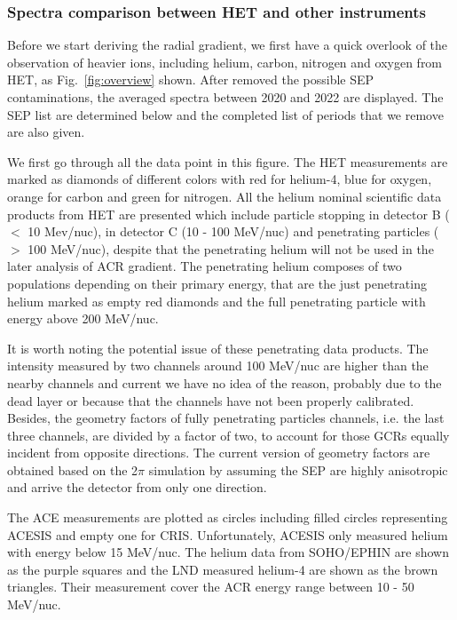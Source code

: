 \subsubsection*{Spectra comparison between \ac{HET} and other instruments}
Before we start deriving the radial gradient, we first have a quick overlook of the observation of heavier ions, including helium, carbon, nitrogen and oxygen from \ac{HET}, as Fig.~\ref{fig:overview} shown. After removed the possible \ac{SEP} contaminations, the averaged spectra between 2020 and 2022 are displayed. The \ac{SEP} list are determined below and the completed list of periods that we remove are also given.

We first go through all the data point in this figure.
The \ac{HET} measurements are marked as diamonds of different colors with red for helium-4, blue for oxygen, orange for carbon and green for nitrogen.
All the helium nominal scientific data products from \ac{HET} are presented which include particle stopping in detector B ($<$ 10 Mev/nuc), in detector C (10 - 100 MeV/nuc) and penetrating particles ($>$ 100 MeV/nuc), despite that the penetrating helium will not be used in the later analysis of \ac{ACR} gradient.
The penetrating helium composes of two populations depending on their primary energy, that are the just penetrating helium marked as empty red diamonds and the full penetrating particle with energy above 200 MeV/nuc. 

It is worth noting the potential issue of these penetrating data products. The intensity measured by two channels around 100 MeV/nuc are higher than the nearby channels and current we have no idea of the reason, probably due to the dead layer or because that the channels have not been properly calibrated.
Besides, the geometry factors of fully penetrating particles channels, i.e. the last three channels, are divided by a factor of two, to account for those \acp{GCR} equally incident from opposite directions. The current version of geometry factors are obtained based on the 2$\pi$ simulation by assuming the \ac{SEP} are highly anisotropic and arrive the detector from only one direction. 

The \ac{ACE} measurements are plotted as circles including filled circles representing \ac{ACESIS} and empty one for \ac{CRIS}. Unfortunately, \ac{ACESIS} only measured helium with energy below 15 MeV/nuc.
The helium data from \ac{SOHO}/\ac{EPHIN} are shown as the purple squares and the \ac{LND} measured helium-4 are shown as the brown triangles. Their measurement cover the \ac{ACR} energy range between 10 - 50 MeV/nuc.

